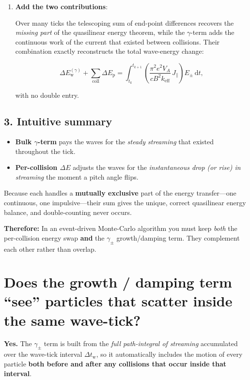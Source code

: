 {\begin{enumerate}
\item \textbf{Add the two contributions}:

Over many ticks the telescoping sum of end-point differences recovers the \emph{missing part} of the quasilinear energy theorem, while the $\gamma$-term adds the continuous work of the current that existed between collisions. Their combination exactly reconstructs the total wave-energy change:

\[
\Delta E_{\mathrm w}^{(\gamma)} + \sum_{\text{coll}} \Delta E_{\mathrm p}
= \int_{t_k}^{t_{k+1}} \left(
\frac{\pi^2 e^2 V_A}{c B^2 k_{\mathrm{eff}}}\, J_\parallel \right) E_\pm\, \mathrm{d}t,
\]

with no double entry.
\end{enumerate}

\subsection*{3. Intuitive summary}

\begin{itemize}
  \item \textbf{Bulk $\gamma$-term} pays the waves for the \emph{steady streaming} that existed throughout the tick.
  \item \textbf{Per-collision $\Delta E$} adjusts the waves for the \emph{instantaneous drop (or rise) in streaming} the moment a pitch angle flips.
\end{itemize}

Because each handles a \textbf{mutually exclusive} part of the energy transfer—one continuous, one impulsive—their sum gives the unique, correct quasilinear energy balance, and double-counting never occurs.

\bigskip

\textbf{Therefore:} In an event-driven Monte-Carlo algorithm you must keep \emph{both} the per-collision energy swap \textbf{and} the $\gamma_\pm$ growth/damping term. They complement each other rather than overlap.

\section*{Does the growth / damping term “see” particles that scatter inside the same wave-tick?}

\textbf{Yes.} The $\gamma_\pm$ term is built from the \emph{full path-integral of streaming} accumulated over the wave-tick interval $\Delta t_{\mathrm w}$, so it automatically includes the motion of every particle \textbf{both before and after any collisions that occur inside that interval}.

}
